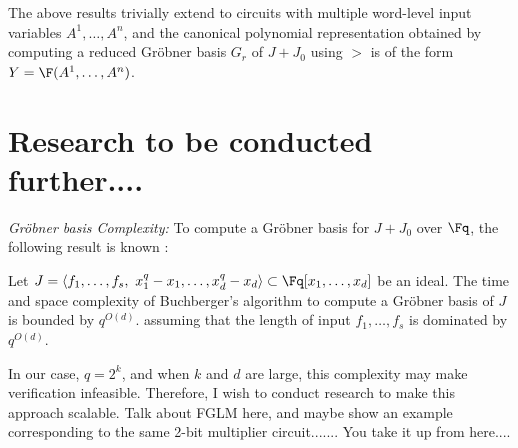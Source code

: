 The above results trivially extend to circuits with multiple
word-level input variables $A^1, \dots, A^n$, and the canonical
polynomial representation obtained by computing a reduced Gr\"obner
basis $G_r$ of $J + J_0$ using $>$ is of the form $Y = \F(A^1, \dots,
A^n)$. 

\section{Research to be conducted further....}

{\it Gr\"obner basis Complexity:} To compute a Gr\"obner basis for
$J + J_0$ over $\Fq$, the following result is known \cite{gao:gf-gb-ms}:  

\begin{Theorem}
Let $J = \langle f_1, \dots, f_s, ~x_1^q - x_1, \dots, x_d^q -
x_d\rangle \subset \Fq [x_1, \dots, x_d]$ be an ideal. The time and
space complexity of Buchberger's algorithm to compute a Gr\"obner
basis of $J$ is bounded by $q^{O(d)}$.
 assuming that the length of input $f_1, \dots, f_s$ is dominated by
 $q^{O(d)}$.  
\end{Theorem}

In our case, $q = 2^k$, and when $k$ and $d$ are large, this complexity
may make  verification infeasible. Therefore, I wish to conduct
research to make this approach scalable. Talk about FGLM here, and
maybe show an example corresponding to the same 2-bit multiplier
circuit....... You take it up from here.... 



